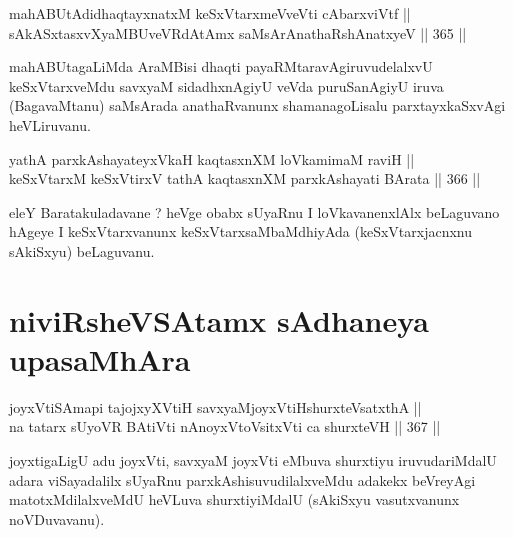 \begin{shl}
\footnotemark[1]mahABUtAdidhaqtayxnatxM keSxVtarxmeVveVti cAbarxviVtf || \\
sAkASxtasxvXyaMBUveVRdAtAmx saMsArAnathaRshAnatxyeV ||  365 ||  
\end{shl}

\begin{artha}
mahABUtagaLiMda AraMBisi dhaqti payaRMtaravAgiruvudelalxvU
keSxVtarxveMdu savxyaM sidadhxnAgiyU veVda puruSanAgiyU iruva
(BagavaMtanu) saMsArada anathaRvanunx shamanagoLisalu parxtayxkaSxvAgi
heVLiruvanu.
\end{artha}


\begin{shl}
yathA parxkAshayateyxVkaH kaqtasxnXM loVkamimaM raviH || \\
keSxVtarxM keSxVtirxV tathA kaqtasxnXM parxkAshayati BArata ||  366 ||  
\end{shl}

\begin{artha}
eleY Baratakuladavane ? heVge obabx sUyaRnu I loVkavanenxlAlx
beLaguvano hAgeye I keSxVtarxvanunx keSxVtarxsaMbaMdhiyAda
(keSxVtarxjacnxnu sAkiSxyu) beLaguvanu.
\end{artha}

\section*{niviRsheVSAtamx sAdhaneya upasaMhAra}


\begin{shl}
joyxVtiSAmapi tajojxyXVtiH savxyaMjoyxVtiHshurxteVsatxthA || \\
na tatarx sUyoVR BAtiVti nAnoyxV\s toV\s sitxVti ca shurxteVH ||  367 ||  
\end{shl}

\begin{artha}
joyxtigaLigU adu joyxVti, savxyaM joyxVti eMbuva shurxtiyu
iruvudariMdalU adara viSayadalilx sUyaRnu parxkAshisuvudilalxveMdu
adakekx beVreyAgi matotxMdilalxveMdU heVLuva shurxtiyiMdalU (sAkiSxyu
vasutxvanunx noVDuvavanu).
\end{artha}

